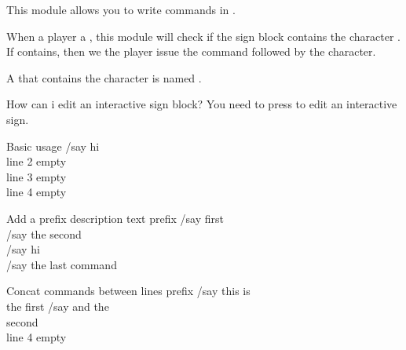This module allows you to write commands in .

When a player  a , this module will check if the sign block contains the character \str{/}.
If contains, then we  the player issue the command followed by the character.

A  that contains the character \str{/} is named .

\begin{note}{How can i edit an interactive sign block?}
    You need to press  to edit an interactive sign.
\end{note}

\begin{example}{Basic usage}
    /say hi \\
    line 2 empty\\
    line 3 empty\\
    line 4 empty
\end{example}

\begin{example}{Add a prefix description text}
    prefix /say first\\
    /say the second\\
    /say hi \\
    /say the last command
\end{example}

\begin{example}{Concat commands between lines}
    prefix /say this is\\
    the first /say and the\\
    second\\
    line 4 empty
\end{example}